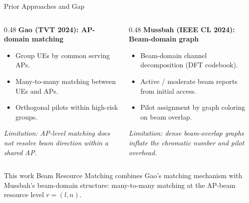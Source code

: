 \documentclass[10pt,aspectratio=169]{beamer}
\newcommand{\BRM}{Beam Resource Matching}
\newenvironment{tightitemize}{%
    \begin{itemize}
        \setlength{\itemsep}{2pt}
        \setlength{\parskip}{0pt}
        \setlength{\parsep}{0pt}
}{%
    \end{itemize}
}
\newcommand{\callout}[1]{%
    \vspace{0.3em}
    {\footnotesize\itshape #1}
}
\begin{document}
\begin{frame}{Prior Approaches and Gap}
    \small
    \begin{columns}[T,onlytextwidth]
        \begin{column}{0.48\textwidth}
            \textbf{Gao (TVT 2024): AP-domain matching}
            \begin{tightitemize}
                \item Group UEs by common serving APs.
                \item Many-to-many matching between UEs and APs.
                \item Orthogonal pilots within high-risk groups.
            \end{tightitemize}

            \vspace{0.3em}
            \callout{Limitation: AP-level matching does not resolve beam direction within a shared AP.}
        \end{column}
        \begin{column}{0.48\textwidth}
            \textbf{Mussbah (IEEE CL 2024): Beam-domain graph}
            \begin{tightitemize}
                \item Beam-domain channel decomposition (DFT codebook).
                \item Active / moderate beam reports from initial access.
                \item Pilot assignment by graph coloring on beam overlap.
            \end{tightitemize}

            \vspace{0.3em}
            \callout{Limitation: dense beam-overlap graphs inflate the chromatic number and pilot overhead.}
        \end{column}
    \end{columns}

    \vspace{0.6em}
    \begin{block}{This work}
        \BRM{} combines Gao's matching mechanism with Mussbah's beam-domain structure: many-to-many matching at the AP-beam resource level \(r=(l,n)\).
    \end{block}
\end{frame}

\end{document}
